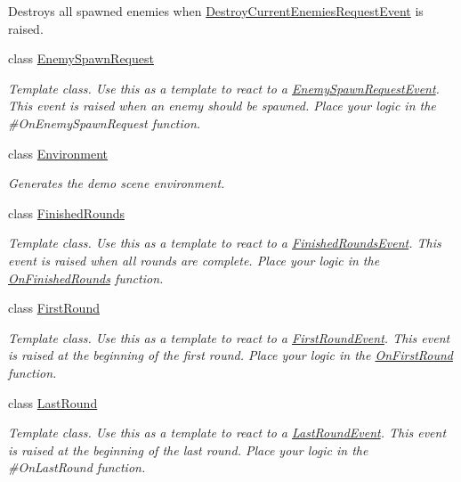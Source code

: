 \begin{DoxyCompactItemize}
\begin{DoxyCompactList}
Destroys all spawned enemies when \hyperlink{class_round_manager_1_1_events_1_1_destroy_current_enemies_request_event}{Destroy\+Current\+Enemies\+Request\+Event} is raised. \end{DoxyCompactList}\item 
class \hyperlink{class_round_manager_1_1_enemy_spawn_request}{Enemy\+Spawn\+Request}
\begin{DoxyCompactList}\small\item\em Template class. Use this as a template to react to a \hyperlink{class_round_manager_1_1_events_1_1_enemy_spawn_request_event}{Enemy\+Spawn\+Request\+Event}. This event is raised when an enemy should be spawned. Place your logic in the \#\+On\+Enemy\+Spawn\+Request function. \end{DoxyCompactList}\item 
class \hyperlink{class_round_manager_1_1_environment}{Environment}
\begin{DoxyCompactList}\small\item\em Generates the demo scene environment. \end{DoxyCompactList}\item 
class \hyperlink{class_round_manager_1_1_finished_rounds}{Finished\+Rounds}
\begin{DoxyCompactList}\small\item\em Template class. Use this as a template to react to a \hyperlink{class_round_manager_1_1_events_1_1_finished_rounds_event}{Finished\+Rounds\+Event}. This event is raised when all rounds are complete. Place your logic in the \hyperlink{class_round_manager_1_1_finished_rounds_af2fcf6393affac3bc199d2b27f982d27}{On\+Finished\+Rounds} function. \end{DoxyCompactList}\item 
class \hyperlink{class_round_manager_1_1_first_round}{First\+Round}
\begin{DoxyCompactList}\small\item\em Template class. Use this as a template to react to a \hyperlink{class_round_manager_1_1_events_1_1_first_round_event}{First\+Round\+Event}. This event is raised at the beginning of the first round. Place your logic in the \hyperlink{class_round_manager_1_1_first_round_a1e871f066611f93a4cb08b168d22185e}{On\+First\+Round} function. \end{DoxyCompactList}\item 
class \hyperlink{class_round_manager_1_1_last_round}{Last\+Round}
\begin{DoxyCompactList}\small\item\em Template class. Use this as a template to react to a \hyperlink{class_round_manager_1_1_events_1_1_last_round_event}{Last\+Round\+Event}. This event is raised at the beginning of the last round. Place your logic in the \#\+On\+Last\+Round function. \end{DoxyCompactList}\item 

\end{DoxyCompactItemize}

